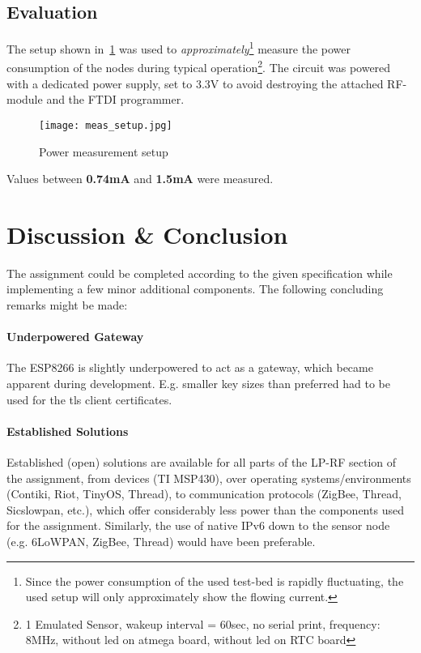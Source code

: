 \subsection{Evaluation}

The setup shown in~\cref{fig:meas_setup} was used to \emph{approximately}\footnote{Since the power consumption of the used test-bed is rapidly fluctuating, the used setup will only approximately show the flowing current.} measure the power consumption of the nodes during typical operation\footnote{1 Emulated Sensor,
wakeup interval = 60sec, no serial print, frequency: 8MHz, without led on atmega board, without led on RTC board}. The circuit was powered with a dedicated power supply, set to 3.3V to avoid destroying the attached RF-module and the FTDI programmer.

\begin{figure}[htb]
  \centering
  \texttt{[image: meas\_setup.jpg]}
  \caption{Power measurement setup}
  \label{fig:meas_setup}
\end{figure}

Values between \textbf{0.74mA} and \textbf{1.5mA} were measured.


\section{Discussion \& Conclusion}

The assignment could be completed according to the given specification while implementing a few minor additional components. The following concluding remarks might be made:

\paragraph{Underpowered Gateway}

The ESP8266 is slightly underpowered to act as a gateway, which became apparent during development. E.g. smaller key sizes than preferred had to be used for the \gls{tls} client certificates.

\paragraph{Established Solutions}

Established (open) solutions are available for all parts of the LP-RF section of the assignment, from devices (TI MSP430), over operating systems/environments (Contiki, Riot, TinyOS, Thread), to communication protocols (ZigBee, Thread, Sicslowpan, etc.), which offer considerably less power than the components used for the assignment. Similarly, the use of native IPv6 down to the sensor node (e.g. 6LoWPAN, ZigBee, Thread) would have been preferable.

